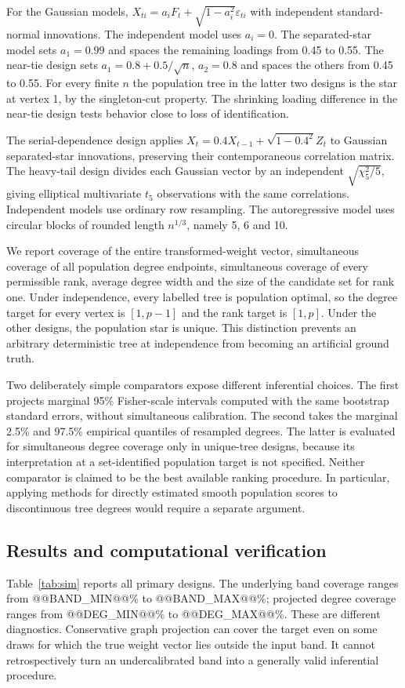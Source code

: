 \documentclass[pdflatex,sn-mathphys-ay]{sn-jnl}
\theoremstyle{thmstyleone}
\theoremstyle{thmstyletwo}
\begin{document}
For the Gaussian models, $X_{ti}=a_i F_t+\sqrt{1-a_i^2}\varepsilon_{ti}$ with independent standard-normal innovations. The independent model uses $a_i=0$. The separated-star model sets $a_1=0.99$ and spaces the remaining loadings from 0.45 to 0.55. The near-tie design sets $a_1=0.8+0.5/\sqrt n$, $a_2=0.8$ and spaces the others from 0.45 to 0.55. For every finite $n$ the population tree in the latter two designs is the star at vertex 1, by the singleton-cut property. The shrinking loading difference in the near-tie design tests behavior close to loss of identification.

The serial-dependence design applies $X_t=0.4X_{t-1}+\sqrt{1-0.4^2}Z_t$ to Gaussian separated-star innovations, preserving their contemporaneous correlation matrix. The heavy-tail design divides each Gaussian vector by an independent $\sqrt{\chi^2_5/5}$, giving elliptical multivariate $t_5$ observations with the same correlations. Independent models use ordinary row resampling. The autoregressive model uses circular blocks of rounded length $n^{1/3}$, namely 5, 6 and 10.

We report coverage of the entire transformed-weight vector, simultaneous coverage of all population degree endpoints, simultaneous coverage of every permissible rank, average degree width and the size of the candidate set for rank one. Under independence, every labelled tree is population optimal, so the degree target for every vertex is $[1,p-1]$ and the rank target is $[1,p]$. Under the other designs, the population star is unique. This distinction prevents an arbitrary deterministic tree at independence from becoming an artificial ground truth.

Two deliberately simple comparators expose different inferential choices. The first projects marginal 95\% Fisher-scale intervals computed with the same bootstrap standard errors, without simultaneous calibration. The second takes the marginal 2.5\% and 97.5\% empirical quantiles of resampled degrees. The latter is evaluated for simultaneous degree coverage only in unique-tree designs, because its interpretation at a set-identified population target is not specified. Neither comparator is claimed to be the best available ranking procedure. In particular, applying methods for directly estimated smooth population scores to discontinuous tree degrees would require a separate argument.

\subsection{Results and computational verification}
Table~\ref{tab:sim} reports all primary designs. The underlying band coverage ranges from @@BAND_MIN@@\% to @@BAND_MAX@@\%; projected degree coverage ranges from @@DEG_MIN@@\% to @@DEG_MAX@@\%. These are different diagnostics. Conservative graph projection can cover the target even on some draws for which the true weight vector lies outside the input band. It cannot retrospectively turn an undercalibrated band into a generally valid inferential procedure.
\end{document}
